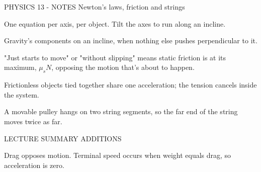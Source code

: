 PHYSICS 13 - NOTES
Newton's laws, friction and strings

One equation per axis, per object. Tilt the axes to run along an incline.

Gravity's components on an incline, when nothing else pushes perpendicular to it.

"Just starts to move" or "without slipping" means static friction is at its maximum, \(\mu_s N\), opposing the motion that's about to happen.

Frictionless objects tied together share one acceleration; the tension cancels inside the system.

A movable pulley hangs on two string segments, so the far end of the string moves twice as far.

LECTURE SUMMARY ADDITIONS

Drag opposes motion. Terminal speed occurs when weight equals drag, so acceleration is zero.
